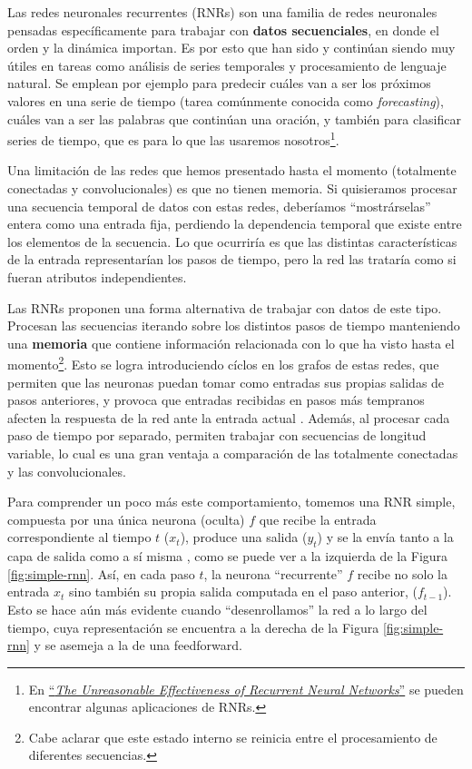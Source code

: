 \documentclass[../../main.tex]{subfiles}
\begin{document}
Las redes neuronales recurrentes (RNRs) son una familia de redes neuronales pensadas
específicamente para trabajar con \textbf{datos secuenciales}, en donde el orden y la
dinámica importan. Es por esto que han sido y continúan siendo muy útiles en tareas como
análisis de series temporales y procesamiento de lenguaje natural. Se emplean por ejemplo
para predecir cuáles van a ser los próximos valores en una serie de tiempo (tarea
comúnmente conocida como \textit{forecasting}), cuáles van a ser las palabras que
continúan una oración, y también para clasificar series de tiempo, que es para lo que las
usaremos nosotros\footnote{En
\href{https://karpathy.github.io/2015/05/21/rnn-effectiveness/}{``\textit{The Unreasonable
Effectiveness of Recurrent Neural Networks}''} se pueden encontrar algunas aplicaciones de
RNRs.}.

Una limitación de las redes que hemos presentado hasta el momento (totalmente conectadas y
convolucionales) es que no tienen memoria. Si quisieramos procesar una secuencia temporal
de datos con estas redes, deberíamos ``mostrárselas'' entera como una entrada fija,
perdiendo la dependencia temporal que existe entre los elementos de la secuencia. Lo que
ocurriría es que las distintas características de la entrada representarían los pasos de
tiempo, pero la red las trataría como si fueran atributos independientes.

Las RNRs proponen una forma alternativa de trabajar con datos de este tipo. Procesan las
secuencias iterando sobre los distintos pasos de tiempo manteniendo una \textbf{memoria}
que contiene información relacionada con lo que ha visto hasta el momento\footnote{Cabe
aclarar que este estado interno se reinicia entre el procesamiento de diferentes
secuencias.}. Esto se logra introduciendo cíclos en los grafos de estas redes, que
permiten que las neuronas puedan tomar como entradas sus propias salidas de pasos
anteriores, y provoca que entradas recibidas en pasos más tempranos afecten la respuesta
de la red ante la entrada actual \cite{ai-a-modern-approach}. Además, al procesar cada
paso de tiempo por separado, permiten trabajar con secuencias de longitud variable, lo
cual es una gran ventaja a comparación de las totalmente conectadas y las convolucionales.

Para comprender un poco más este comportamiento, tomemos una RNR simple, compuesta por una
única neurona (oculta) \(f\) que recibe la entrada correspondiente al tiempo \(t\)
(\(x_t\)), produce una salida (\(y_t\)) y se la envía tanto a la capa de salida como a sí
misma \cite{hands-on-ML-sklearn-tf}, como se puede ver a la izquierda de la Figura
\ref{fig:simple-rnn}. Así, en cada paso \(t\), la neurona ``recurrente'' \(f\) recibe no
solo la entrada \(x_t\) sino también su propia salida computada en el paso anterior,
(\(f_{t-1}\)). Esto se hace aún más evidente cuando ``desenrollamos'' la red a lo largo del
tiempo, cuya representación se encuentra a la derecha de la Figura \ref{fig:simple-rnn} y
se asemeja a la de una feedforward.
\end{document}

